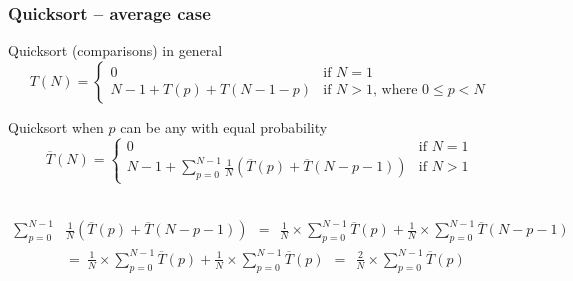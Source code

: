 \documentclass[aspectratio=169]{beamer}
\begin{document}
\begin{frame}\frametitle{Quicksort -- average case}

  \begin{block}{Quicksort (comparisons) in general}
  $$T(N) = \left\{
    \begin{array}{ll}
      0 & \text{if }N=1
      \\
      N-1 + T(p) + T(N-1-p) & \text{if }N>1\text{, where }0\leq p < N
    \end{array}
  \right.$$
  \end{block}

  \begin{alertblock}{Quicksort when $p$ can be any with equal probability}
  $$\overline{T}(N) = \left\{
    \begin{array}{ll}
      0 & \text{if }N=1
      \\
      N-1 + \sum_{p=0}^{N-1} \frac{1}{N}(\overline{T}(p)+\overline{T}(N-p-1)) & \text{if }N>1
    \end{array}
  \right.$$
  \end{alertblock}

  \pause~\\[-13mm]
  \begin{align*}
    \sum_{p=0}^{N-1} & \frac{1}{N}(\overline{T}(p)+\overline{T}(N-p-1))
      ~~=~~\frac{1}{N}\times \sum_{p=0}^{N-1}\overline{T}(p) +
         \frac{1}{N}\times \sum_{p=0}^{N-1}\overline{T}(N-p-1)
      \\&=~\frac{1}{N}\times \sum_{p=0}^{N-1}\overline{T}(p) +
         \frac{1}{N}\times \sum_{p=0}^{N-1}\overline{T}(p)
      ~~=~~\frac{2}{N}\times \sum_{p=0}^{N-1}\overline{T}(p)
  \end{align*}
\end{frame}
\end{document}

